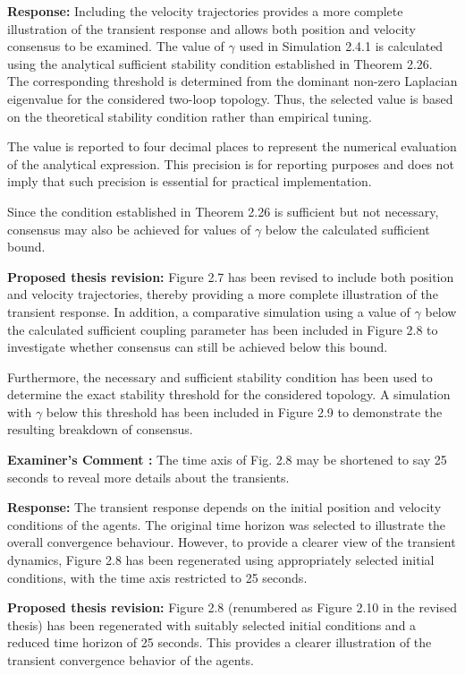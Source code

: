 \documentclass[11pt,a4paper]{article}
\newcounter{examcomment}
\renewcommand{\theexamcomment}{\arabic{examcomment}}
\newcommand{\comment}[1]{%
\refstepcounter{examcomment}%
\par\vspace{5pt}\noindent
\colorbox{gray!13}{%
	\parbox{\dimexpr\linewidth-2\fboxsep}{%
		\textbf{Examiner's Comment \theexamcomment:} #1%
	}%
}%
\par
}
\newcommand{\response}{\par\textbf{Response:} }
\newcommand{\revision}{\par\textbf{Proposed thesis revision:} }
\begin{document}
\response
Including the velocity trajectories provides a more complete illustration of the transient response and allows both position and velocity consensus to be examined. The value of $\gamma$ used in Simulation 2.4.1 is calculated using the analytical sufficient stability condition established in Theorem 2.26. The corresponding threshold is determined from the dominant non-zero Laplacian eigenvalue for the considered two-loop topology. Thus, the selected value is based on the theoretical stability condition rather than empirical tuning.

The value is reported to four decimal places to represent the numerical evaluation of the analytical expression. This precision is for reporting purposes and does not imply that such precision is essential for practical implementation.

Since the condition established in Theorem 2.26 is sufficient but not necessary, consensus may also be achieved for values of $\gamma$ below the calculated sufficient bound.

\revision
Figure 2.7 has been revised to include both position and velocity trajectories, thereby providing a more complete illustration of the transient response. In addition, a comparative simulation using a value of $\gamma$ below the calculated sufficient coupling parameter has been included in Figure 2.8 to investigate whether consensus can still be achieved below this bound.

Furthermore, the necessary and sufficient stability condition has been used to determine the exact stability threshold for the considered topology. A simulation with $\gamma$ below this threshold has been included in Figure 2.9 to demonstrate the resulting breakdown of consensus.


\comment{The time axis of Fig. 2.8 may be shortened to say 25 seconds to reveal more details about the transients.}

\response
The transient response depends on the initial position and velocity conditions of the agents. The original time horizon was selected to illustrate the overall convergence behaviour. However, to provide a clearer view of the transient dynamics, Figure 2.8 has been regenerated using appropriately selected initial conditions, with the time axis restricted to 25 seconds.

\revision
Figure 2.8 (renumbered as Figure 2.10 in the revised thesis) has been regenerated with suitably selected initial conditions and a reduced time horizon of 25 seconds. This provides a clearer illustration of the transient convergence behavior of the agents.
\end{document}
